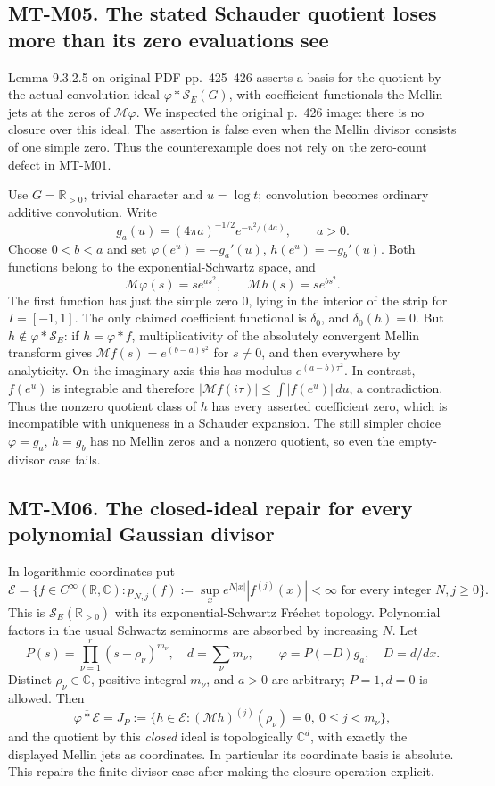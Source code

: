 \documentclass[11pt,a4paper]{article}
\begin{document}
\subsection*{MT-M05. The stated Schauder quotient loses more than its zero evaluations see}
Lemma 9.3.2.5 on original PDF pp.~425--426 asserts a basis for the
quotient by the actual convolution ideal $\varphi*\mathcal S_E(G)$,
with coefficient functionals the Mellin jets at the zeros of
$\mathcal M\varphi$. We inspected the original p.~426 image: there
is no closure over this ideal. The assertion is false even when the
Mellin divisor consists of one simple zero. Thus the counterexample
does not rely on the zero-count defect in MT-M01.

Use $G=\mathbb R_{>0}$, trivial character and $u=\log t$; convolution
becomes ordinary additive convolution. Write
\[
 g_a(u)=(4\pi a)^{-1/2}e^{-u^2/(4a)},\qquad a>0.
\]
Choose $0<b<a$ and set $\varphi(e^u)=-g_a'(u)$,
$h(e^u)=-g_b'(u)$. Both functions belong to the exponential-Schwartz
space, and
\[
 \mathcal M\varphi(s)=s e^{as^2},\qquad
 \mathcal Mh(s)=s e^{bs^2}.
\]
The first function has just the simple zero $0$, lying in the interior
of the strip for $I=[-1,1]$. The only claimed coefficient functional is
$\delta_0$, and $\delta_0(h)=0$.
But $h\notin\varphi*\mathcal S_E$: if $h=\varphi*f$, multiplicativity
of the absolutely convergent Mellin transform gives
$\mathcal Mf(s)=e^{(b-a)s^2}$ for $s\ne0$, and then everywhere by
analyticity. On the imaginary axis this has modulus
$e^{(a-b)\tau^2}$. In contrast, $f(e^u)$ is integrable and therefore
$|\mathcal Mf(i\tau)|\le\int|f(e^u)|\,du$, a contradiction.
Thus the nonzero quotient class of $h$ has every asserted coefficient
zero, which is incompatible with uniqueness in a Schauder expansion.
The still simpler choice $\varphi=g_a$, $h=g_b$ has no Mellin zeros
and a nonzero quotient, so even the empty-divisor case fails.

\subsection*{MT-M06. The closed-ideal repair for every polynomial Gaussian divisor}
In logarithmic coordinates put
\[
 \mathcal E=\{f\in C^\infty(\mathbb R,\mathbb C):
   p_{N,j}(f):=\sup_x e^{N|x|}|f^{(j)}(x)|<\infty
   \text{ for every integer }N,j\ge0\}.
\]
This is $\mathcal S_E(\mathbb R_{>0})$ with its exponential-Schwartz
Fr\'echet topology. Polynomial factors in the usual Schwartz seminorms
are absorbed by increasing $N$. Let
\[
 P(s)=\prod_{\nu=1}^r(s-\rho_\nu)^{m_\nu},\quad
 d=\sum_\nu m_\nu,\qquad
 \varphi=P(-D)g_a,\quad D=d/dx.
\]
Distinct $\rho_\nu\in\mathbb C$, positive integral $m_\nu$, and
$a>0$ are arbitrary; $P=1,d=0$ is allowed. Then
\[
 \overline{\varphi*\mathcal E}
   =J_P:=\{h\in\mathcal E:
          (\mathcal Mh)^{(j)}(\rho_\nu)=0,
          \ 0\le j<m_\nu\},                         \tag{MT-M6}
\]
and the quotient by this \emph{closed} ideal is topologically
$\mathbb C^d$, with exactly the displayed Mellin jets as coordinates.
In particular its coordinate basis is absolute. This repairs the
finite-divisor case after making the closure operation explicit.
\end{document}
